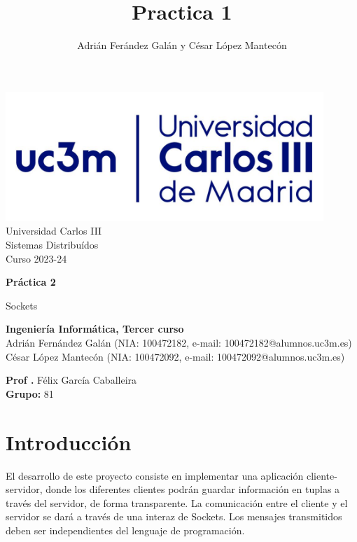 \documentclass[]{article}
\title{Practica 1}
\author{Adrián Ferández Galán y César López Mantecón}
\begin{document}
\begin{titlepage}
    \centering
   \includegraphics[width=0.9\textwidth]{uc3m.jpg} 
    {\Huge Universidad Carlos III\\
    
     \Large Sistemas Distribuídos\\
     \vspace{0.5cm}
     Curso 2023-24}
    \vspace{2cm}

    {\Huge \textbf{Práctica 2} \par}
    \vspace{0.5cm}
    {\Large Sockets \par}
    \vspace{8cm}

   \textbf{Ingeniería Informática, Tercer curso}\\
    \vspace{0.2cm} 
    Adrián Fernández Galán (NIA: 100472182, e-mail: 100472182@alumnos.uc3m.es) \\
    César López Mantecón   (NIA: 100472092, e-mail: 100472092@alumnos.uc3m.es)
    \vspace{0.5cm}

   
    \textbf{Prof .} Félix García Caballeira\\
    \textbf{Grupo: } 81   
    
\end{titlepage}
\newpage

\renewcommand{\contentsname}{\centering Índice}
\tableofcontents

\newpage

\section{Introducción}
\label{sec:introduccion}
El desarrollo de este proyecto consiste en implementar una aplicación cliente-servidor, donde los diferentes clientes podrán guardar información en tuplas a través del servidor, de forma transparente. La comunicación entre el cliente y el servidor se dará a través de una interaz de Sockets. Los mensajes transmitidos deben ser independientes del lenguaje de programación. 
\end{document}
